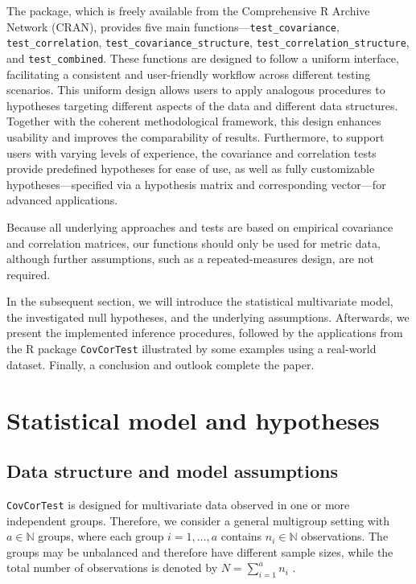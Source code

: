 The package, which is freely available from the Comprehensive R Archive Network
(CRAN), provides five main functions---\texttt{test\_covariance},
\texttt{test\_correlation}, \texttt{test\_covariance\_structure},
\texttt{test\_correlation\_structure}, and \texttt{test\_combined}. These
functions are designed to follow a uniform interface, facilitating a
consistent and user-friendly workflow across different testing scenarios. This
uniform design allows users to apply analogous procedures to hypotheses
targeting different aspects of the data and different data structures.
Together with the coherent methodological framework, this design enhances
usability and improves the comparability of results. Furthermore, to support users with varying levels of experience, the covariance
and correlation tests provide predefined hypotheses for ease of use, as well as
fully customizable hypotheses---specified via a hypothesis matrix and
corresponding vector---for advanced applications.

Because all underlying approaches and tests are based on empirical covariance and correlation
matrices, our functions should only be used for metric data, although further
assumptions, such as a repeated-measures design, are not required.

In the subsequent section, we will introduce the statistical multivariate
model, the investigated null hypotheses, and the underlying assumptions.
Afterwards, we present the implemented inference procedures, followed by the
applications from the R package \texttt{CovCorTest} illustrated by some
examples using a real-world dataset. Finally, a conclusion and outlook
complete the paper.

\section{Statistical model and hypotheses}\label{statistical-model-and-hypotheses}

\subsection{Data structure and model assumptions}\label{data-structure-and-model-assumptions}

\texttt{CovCorTest} is designed for multivariate data observed in one or more
independent groups. Therefore, we consider a general multigroup setting with
\(a \in \mathbb{N}\) groups, where each group \(i = 1, \dots, a\) contains
\(n_i \in \mathbb{N}\) observations. The groups may be unbalanced and therefore
have different sample sizes, while the total number of observations is denoted
by \(N = \sum_{i=1}^a n_i\) .

